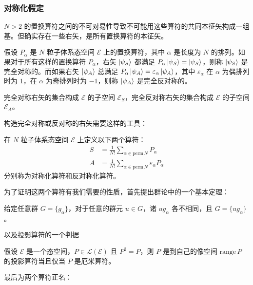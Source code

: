 \documentclass[cn,10pt,math=newtx,citestyle=gb7714-2015,bibstyle=gb7714-2015]{elegantbook}
\def\ms{\mathscr}
\def\mc{\mathcal}
\def\ve{\varepsilon}
\begin{document}
\subsubsection{对称化假定}

$N>2$ 的置换算符之间的不可对易性导致不可能用这些算符的共同本征矢构成一组基。但确实存在一些右矢，是所有置换算符的本征矢。

\begin{definition}[完全对称与完全反对称右矢]
    假设 $P_\alpha$ 是 $N$ 粒子体系态空间 $\ms E$ 上的置换算符，其中 $\alpha$ 是长度为 $N$ 的排列。如果对于所有这样的置换算符 $P_\alpha$，右矢 $\ket{\psi_S}$ 都满足 $P_\alpha\ket{\psi_S} = \ket{\psi_S}$，则称 $\ket{\psi_S}$ 是完全对称的。而如果右矢 $\ket{\psi_A}$ 总满足 $P_\alpha\ket{\psi_A} = \ve_\alpha\ket{\psi_A}$，其中 $\ve_\alpha$ 在 $\alpha$ 为偶排列时为 $1$，在 $\alpha$ 为奇排列时为 $-1$，则称 $\ket{\psi_A}$ 是完全反对称的。
    
    完全对称右矢的集合构成 $\ms E$ 的子空间 $\ms E_S$，完全反对称右矢的集合构成 $\ms E$ 的子空间 $\ms E_A$。
\end{definition}

构造完全对称或反对称的右矢需要这样的工具：
\begin{definition}[对称化算符与反对称化算符]
    在 $N$ 粒子体系态空间 $\ms E$ 上定义以下两个算符：
    \begin{align}
        S &= \frac{1}{N!}\sum_{\alpha\in\text{perm}\,N}P_\alpha\\
        A &= \frac{1}{N!}\sum_{\alpha\in\text{perm}\,N}\ve_\alpha P_\alpha
    \end{align}
    分别称为对称化算符和反对称化算符。
\end{definition}

为了证明这两个算符有我们需要的性质，首先提出群论中的一个基本定理：

\begin{lemma}[群的重排定理]
    给定任意群 $G = \{g_\alpha\}$，对于任意的群元 $u\in G$，诸 $ug_\alpha$ 各不相同，且 $G=\{ug_\alpha\}$。
\end{lemma}

以及投影算符的一个判据
\begin{lemma}[厄米算符与投影算符的关系]\label{lem:Hrmt_prjct}
    假设 $\ms E$ 是一个态空间，$P\in\mc L(\ms E)$ 且 $P^2=P$，则 $P$ 是到自己的像空间 $\text{range}\,P$ 的投影算符当且仅当 $P$ 是厄米算符。
\end{lemma}

最后为两个算符正名：
\end{document}

